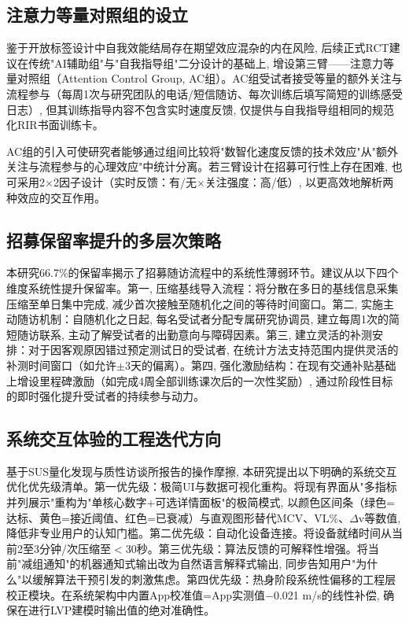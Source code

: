 \subsection{注意力等量对照组的设立}
\label{sec:attention_control}

鉴于开放标签设计中自我效能结局存在期望效应混杂的内在风险, 后续正式RCT建议在传统"AI辅助组"与"自我指导组"二分设计的基础上, 增设第三臂——注意力等量对照组（Attention Control Group, AC组）。AC组受试者接受等量的额外关注与流程参与（每周1次与研究团队的电话/短信随访、每次训练后填写简短的训练感受日志）, 但其训练指导内容不包含实时速度反馈, 仅提供与自我指导组相同的规范化RIR书面训练卡。

AC组的引入可使研究者能够通过组间比较将"数智化速度反馈的技术效应"从"额外关注与流程参与的心理效应"中统计分离。若三臂设计在招募可行性上存在困难, 也可采用2$\times$2因子设计（实时反馈：有/无$\times$关注强度：高/低）, 以更高效地解析两种效应的交互作用。

\subsection{招募保留率提升的多层次策略}
\label{sec:retention_strategy}

本研究66.7\%的保留率揭示了招募随访流程中的系统性薄弱环节。建议从以下四个维度系统性提升保留率。第一, 压缩基线导入流程：将分散在多日的基线信息采集压缩至单日集中完成, 减少首次接触至随机化之间的等待时间窗口。第二, 实施主动随访机制：自随机化之日起, 每名受试者分配专属研究协调员, 建立每周1次的简短随访联系, 主动了解受试者的出勤意向与障碍因素。第三, 建立灵活的补测安排：对于因客观原因错过预定测试日的受试者, 在统计方法支持范围内提供灵活的补测时间窗口（如允许$\pm$3天的偏离）。第四, 强化激励结构：在现有交通补贴基础上增设里程碑激励（如完成4周全部训练课次后的一次性奖励）, 通过阶段性目标的即时强化提升受试者的持续参与动力。

\subsection{系统交互体验的工程迭代方向}
\label{sec:system_iteration}

基于SUS量化发现与质性访谈所报告的操作摩擦, 本研究提出以下明确的系统交互优化优先级清单。第一优先级：极简UI与数据可视化重构。将现有界面从"多指标并列展示"重构为"单核心数字+可选详情面板"的极简模式, 以颜色区间条（绿色=达标、黄色=接近阈值、红色=已衰减）与直观图形替代MCV、VL\%、$\Delta$v等数值, 降低非专业用户的认知门槛。第二优先级：自动化设备连接。将设备就绪时间从当前2至3分钟/次压缩至$<$30秒。第三优先级：算法反馈的可解释性增强。将当前"减组通知"的机器通知式输出改为自然语言解释式输出, 同步告知用户"为什么"以缓解算法干预引发的刺激焦虑。第四优先级：热身阶段系统性偏移的工程层校正模块。在系统架构中内置App校准值=App实测值$-$0.021 m/s的线性补偿, 确保在进行LVP建模时输出值的绝对准确性。

